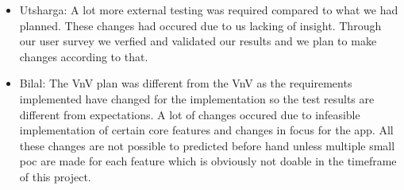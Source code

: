 \documentclass[12pt, titlepage]{article}
\begin{document}
\begin{itemize}
\item Utsharga: A lot more external testing was required compared to what we had planned. These changes had occured due to us lacking of insight. Through our user survey we verfied and validated our results and we plan to make changes according to that.
\item Bilal: The VnV plan was different from the VnV as the requirements implemented have changed for the implementation so the test results are 
different from expectations. A lot of changes occured due to infeasible implementation of certain core features and changes in focus for the app. 
All these changes are not possible to predicted before hand unless multiple small poc are made for each feature which is obviously not doable in 
the timeframe of this project.
\end{itemize}
\end{document}
